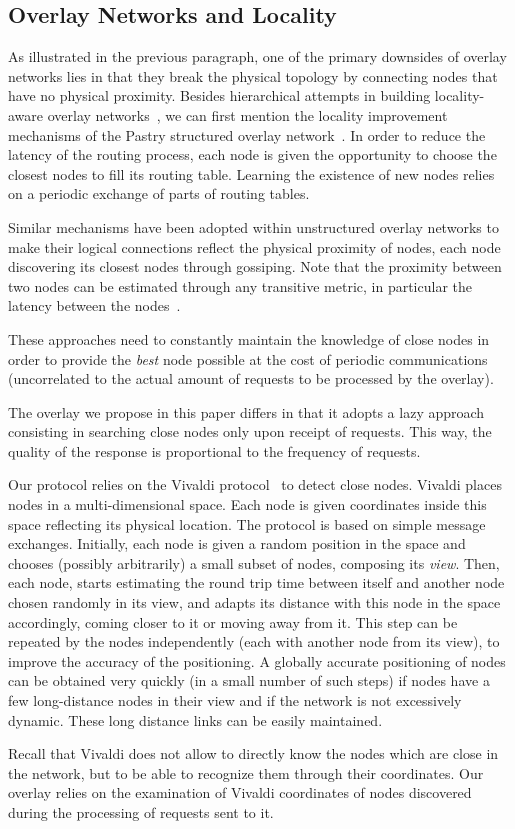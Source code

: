
\subsection{Overlay Networks and Locality}

As illustrated in the previous paragraph, one of the primary downsides of overlay networks
lies in that they break the physical topology by connecting nodes that have no physical
proximity.
%
Besides hierarchical attempts in building locality-aware overlay
networks~\cite{superchord,ECAN,XuMK03}, we can first mention the locality
improvement mechanisms of the Pastry structured overlay
network~\cite{pastry}. In order to reduce the latency of the routing process,
each node is given the opportunity to choose the closest nodes to fill its
routing table. Learning the existence of new nodes relies on a periodic exchange
of parts of routing tables.

Similar mechanisms have been adopted within unstructured overlay networks to make their
logical connections reflect the physical proximity of nodes, each node discovering its
closest nodes through gossiping. Note that the proximity between two nodes can be
estimated through any transitive metric, in particular the latency between the
nodes~\cite{tman}.

These approaches need to constantly maintain the knowledge of close nodes in order to
provide the \emph{best} node possible at the cost of periodic communications (uncorrelated
to the actual amount of requests to be processed by the overlay).

The overlay we propose in this paper differs in that it adopts a lazy approach consisting
in searching close nodes only upon receipt of requests. This way, the quality of the response
is proportional to the frequency of requests.

Our protocol relies on the Vivaldi protocol~\cite{dabek:2001:sigcomm04} to detect close
nodes. Vivaldi places nodes in a multi-dimensional space. Each node is given coordinates
inside this space reflecting its physical location. The protocol is based on simple
message exchanges. Initially, each node is given a random position in the space and
chooses (possibly arbitrarily) a small subset of nodes, composing its \emph{view}. Then,
each node, starts estimating the round trip time between itself and another node chosen
randomly in its view, and adapts its distance with this node in the space accordingly,
coming closer to it or moving away from it. This step can be repeated by the nodes
independently (each with another node from its view), to improve the accuracy of the
positioning. A globally accurate positioning of nodes can be obtained very quickly (in a
small number of such steps) if nodes have a few long-distance nodes in their view and if the
network is not excessively dynamic. These long distance links can be easily maintained.

Recall that Vivaldi does not allow to directly know the nodes which are close in
the network, but to be able to recognize them through their coordinates. Our
overlay relies on the examination of Vivaldi coordinates of nodes discovered
during the processing of requests sent to it.






